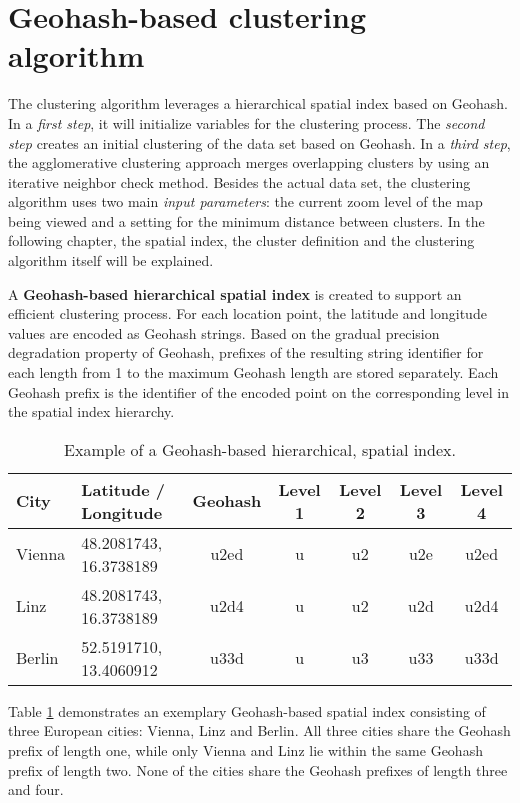 
%
%

\section{Geohash-based clustering algorithm}
\label{chapter:algorithm}

The clustering algorithm leverages a hierarchical spatial index based on Geohash. In a \textit{first step}, it will initialize variables for the clustering process. The \textit{second step} creates an initial clustering of the data set based on Geohash. In a \textit{third step}, the agglomerative clustering approach merges overlapping clusters by using an iterative neighbor check method. Besides the actual data set, the clustering algorithm uses two main \textit{input parameters}: the current zoom level of the map being viewed and a setting for the minimum distance between clusters. In the following chapter, the spatial index, the cluster definition and the clustering algorithm itself will be explained.

A \textbf{Geohash-based hierarchical spatial index} is created to support an efficient clustering process. For each location point, the latitude and longitude values are encoded as Geohash strings. Based on the gradual precision degradation property of Geohash, prefixes of the resulting string identifier for each length from 1 to the maximum Geohash length are stored separately. Each Geohash prefix is the identifier of the encoded point on the corresponding level in the spatial index hierarchy. 

\begin{table}[ht]
\begin{center}
\begin{tabular}{ |l|l|c|c|c|c|c| }
  \hline
  City & Latitude / Longitude & Geohash & Level 1 & Level 2 & Level 3 & Level 4  \\
  \hline
  Vienna & 48.2081743, 16.3738189 & u2ed & u & u2 & u2e & u2ed \\
  Linz   & 48.2081743, 16.3738189 & u2d4 & u & u2 & u2d & u2d4 \\
  Berlin & 52.5191710, 13.4060912 & u33d & u & u3 & u33 & u33d \\
  \hline
\end{tabular}
\caption{Example of a Geohash-based hierarchical, spatial index.}
\label{table:algorithm-geohash}
\end{center}
\end{table}

Table \ref{table:algorithm-geohash} demonstrates an exemplary Geohash-based spatial index consisting of three European cities: Vienna, Linz and Berlin. All three cities share the Geohash prefix of length one, while only Vienna and Linz lie within the same Geohash prefix of length two. None of the cities share the Geohash prefixes of length three and four.

